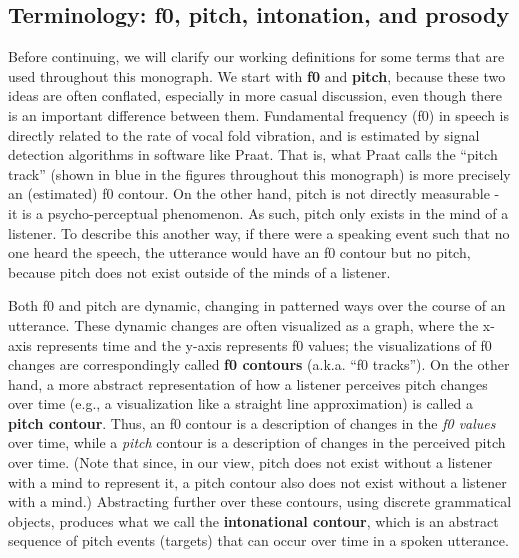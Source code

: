 \subsection{Terminology: f0, pitch, intonation, and prosody}\label{sec:terminology}

Before continuing, we will clarify our working definitions for some terms that are used throughout this monograph. We start with \textbf{f0} and \textbf{pitch}, because these two ideas are often conflated, especially in more casual discussion, even though there is an important difference between them. Fundamental frequency (f0) in speech is directly related to the rate of vocal fold vibration, and is estimated by signal detection algorithms in software like Praat. That is, what Praat calls the “pitch track” (shown in blue in the figures throughout this monograph) is more precisely an (estimated) f0 contour. On the other hand, pitch is not directly measurable - it is a psycho-perceptual phenomenon. As such, pitch only exists in the mind of a listener. To describe this another way, if there were a speaking event such that no one heard the speech, the utterance would have an f0 contour but no pitch, because pitch does not exist outside of the minds of a listener.

Both f0 and pitch are dynamic, changing in patterned ways over the course of an utterance. These dynamic changes are often visualized as a graph, where the x-axis represents time and the y-axis represents f0 values; the visualizations of f0 changes are correspondingly called \textbf{f0 contours} (a.k.a. “f0 tracks”). On the other hand, a more abstract representation of how a listener perceives pitch changes over time (e.g., a visualization like a straight line approximation) is called a \textbf{pitch contour}. Thus, an f0 contour is a description of changes in the \emph{f0 values} over time, while a \emph{pitch} contour is a description of changes in the perceived pitch over time. (Note that since, in our view, pitch does not exist without a listener with a mind to represent it, a pitch contour also does not exist without a listener with a mind.) Abstracting further over these contours, using discrete grammatical objects, produces what we call the \textbf{intonational contour}, which is an abstract sequence of pitch events (targets) that can occur over time in a spoken utterance.

